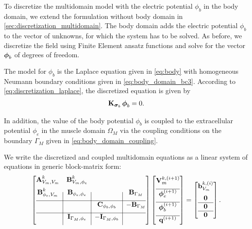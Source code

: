 To discretize the multidomain model with the electric potential $\phi_b$ in the body domain, we extend the formulation without body domain in \cref{sec:discretization_multidomain}.
The body domain adds the electric potential $\phi_b$ to the vector of unknowns, for which the system has to be solved. As before, we discretize the field using Finite Element ansatz functions and solve for the vector $\boldsymbol{\phi}_b$ of degrees of freedom.

The model for $\phi_b$ is the Laplace equation given in \cref{eq:body} with homogeneous Neumann boundary conditions given in \cref{eq:body_domain_bc3}. According to \cref{eq:discretization_laplace}, the discretized equation is given by
\begin{align}\label{eq:discretized_body}
  \textbf{K}_{\boldsymbol{\sigma}_b}\,\boldsymbol{\phi}_b = 0.
\end{align}

In addition, the value of the body potential $\phi_b$ is coupled to the extracellular potential $\phi_e$ in the muscle domain $\Omega_M$ via the coupling conditions on the boundary $\Gamma_M$ given in \cref{eq:body_domain_coupling}.

We write the discretized and coupled multidomain equations as a linear system of equations in generic block-matrix form:
\begin{align}\label{eq:discretized_multidomain_body}
  \left[
  \begin{array}{@{}c|c|c|c@{}}
    \bfA_{V_m,V_m}^k & \bfB_{V_m,\phi_e}^k & &\\[2mm]
    \bfB_{\phi_e,V_m}^k & \bfB_{\phi_e,\phi_e} & &\bfB_{\Gamma_M} \\[2mm] \hline
    &&\bfC_{\phi_b,\phi_b} & -\bfB_{\Gamma_M}\\[2mm]\hline
    & \bfI_{\Gamma_M,\phi_e} & -\bfI_{\Gamma_M,\phi_b} &\\[2mm]
  \end{array}
  \right]
  \left[
  \begin{array}{@{}c@{}}
    \bfV_{m}^{k,(i+1)}  \\[2mm]\hline 
    \bfphi_{e}^{(i+1)} \\[2mm]\hline
    \bfphi_{b}^{(i+1)}  \\[2mm]\hline
    \bfq^{(i+1)}
  \end{array}\right]
  = 
  \left[\begin{array}{@{}c@{}}
    \bfb_{V_m}^{k,(i)} \\[2mm]
    \bfzero\\\hline
    \bfzero\\\hline 
    \bfzero
  \end{array}\right].
\end{align}

